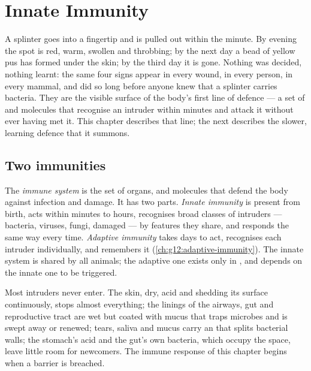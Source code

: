 \chapter{Innate Immunity}\label{ch:g12:innate-immunity}

A splinter goes into a fingertip and is pulled out within the minute.
By evening the spot is red, warm, swollen and throbbing; by the next
day a bead of yellow pus has formed under the skin; by the third day it
is gone. Nothing was decided, nothing learnt: the same four signs
appear in every wound, in every person, in every mammal, and did so
long before anyone knew that a splinter carries bacteria. They are the
visible surface of the body's first line of defence --- a set of 
and molecules that recognise an intruder within minutes and attack it
without ever having met it. This chapter describes that line; the next
describes the slower, learning defence that it summons.

\section{Two immunities}

\begin{definition}\label{def:g12:innate-immunity:immunity}
The \emph{immune system} is the set of organs,
 and molecules that defend the body against infection and
damage. It has two parts. \emph{Innate immunity}
is present from birth, acts within minutes to hours, recognises broad
classes of intruders --- bacteria, viruses, fungi, damaged  --- by
features they share, and responds the same way every time.
\emph{Adaptive immunity} takes days to act,
recognises each intruder individually, and remembers it
(\cref{ch:g12:adaptive-immunity}). The innate system is shared by all
animals; the adaptive one exists only in , and depends on
the innate one to be triggered.
\end{definition}

\begin{proposition}\label{prop:g12:innate-immunity:barriers}
Most intruders never enter. The skin, dry, acid and shedding its
surface continuously, stops almost everything; the linings of the
airways, gut and reproductive tract are wet but coated with mucus that
traps microbes and is swept away or renewed; tears, saliva and mucus
carry an  that splits bacterial walls; the stomach's acid and the
gut's own bacteria, which occupy the space, leave little room for
newcomers. The immune response of this chapter begins when a barrier
is breached.
\end{proposition}
\admitted

